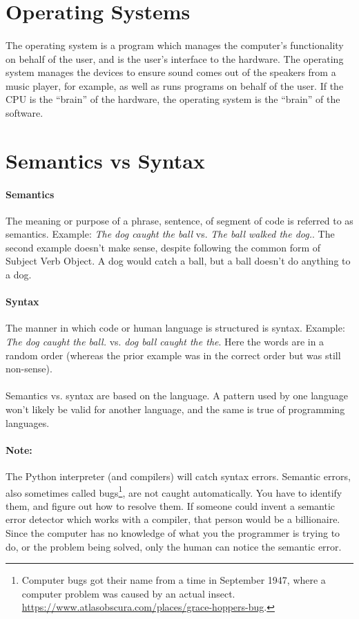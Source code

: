 \documentclass[letter,10pt]{article}
\begin{document}
\section{Operating Systems}
\paragraph{}The operating system is a program which manages the computer's functionality on behalf of the user, and is the user's interface to the hardware. The operating system manages the devices to ensure sound comes out of the speakers from a music player, for example, as well as runs programs on behalf of the user. If the CPU is the ``brain'' of the hardware, the operating system is the ``brain'' of the software.

\section{Semantics vs Syntax}
\paragraph{Semantics} The meaning or purpose of a phrase, sentence, of segment of code is referred to as semantics. Example: \textit{The dog caught the ball} vs. \textit{The ball walked the dog.}. The second example doesn't make sense, despite following the common form of Subject Verb Object. A dog would catch a ball, but a ball doesn't do anything to a dog.

\paragraph{Syntax} The manner in which code or human language is structured is syntax. Example: \textit{The dog caught the ball.} vs. \textit{dog ball caught the the}. Here the words are in a random order (whereas the prior example was in the correct order but was still non-sense).

\paragraph{}Semantics vs. syntax are based on the language. A pattern used by one language won't likely be valid for another language, and the same is true of programming languages.

\paragraph{Note:}The Python interpreter (and compilers) will catch syntax errors. Semantic errors, also sometimes called bugs\footnote{Computer bugs got their name from a time in September 1947, where a computer problem was caused by an actual insect. \url{https://www.atlasobscura.com/places/grace-hoppers-bug}.}, are not caught automatically. You have to identify them, and figure out how to resolve them. If someone could invent a semantic error detector which works with a compiler, that person would be a billionaire. Since the computer has no knowledge of what you the programmer is trying to do, or the problem being solved, only the human can notice the semantic error.
\end{document}
